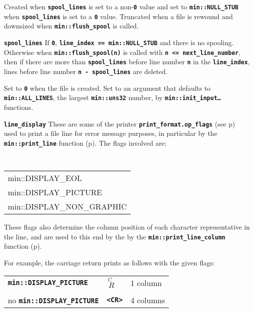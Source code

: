 \documentclass[12pt]{article}
\makeatletter
\newcommand{\TT}[1]{{\tt \bfseries #1}}
\newcommand{\ttmkey}[2]{\TT{#1}\index{#1@{\tt #1}!#2}}
\newcommand{\pagref}[1]{p\pageref{#1}}
\newcommand{\EOL}{\penalty \exhyphenpenalty}
\newenvironment{indpar}[1][0.3in]%
	{\begin{list}{}%
		     {\setlength{\itemsep}{0in}%
		      \setlength{\topsep}{0in}%
		      \setlength{\parsep}{1ex}%
		      \setlength{\labelwidth}{#1}%
		      \setlength{\leftmargin}{#1}%
		      \addtolength{\leftmargin}{\labelsep}}%
	 \item}%
	{\end{list}}
\newenvironment{itemlist}[1][1.2in]%
	{\begin{list}{}{\setlength{\labelwidth}{#1}%
		        \setlength{\leftmargin}{\labelwidth}%
		        \addtolength{\leftmargin}{+0.2in}%
		        \renewcommand{\makelabel}[1]{##1\hfill}}}%
	{\end{list}}
\makeatother
\begin{document}
\begin{itemlist}[1.4in]
Created when \TT{spool\_\EOL lines} is set to a non-\TT{0} value
and set to \TT{min::\EOL NULL\_\EOL STUB}
when \TT{spool\_\EOL lines} is set to a \TT{0} value.
Truncated when a file is rewound and downsized when
\TT{min::\EOL flush\_\EOL spool} is called.

\item[\ttmkey{spool\_\EOL lines}{in {\tt min::file}}]
If \TT{0}, \TT{line\_index~==~min::NULL\_STUB} and there is
no spooling.  Otherwise when \TT{min::flush\_spool(n)} is called
with \TT{n <= next\_\EOL line\_\EOL number}, then
if there are more than \TT{spool\_\EOL lines} before line number
\TT{n} in the \TT{line\_\EOL index}, lines before
line number \TT{n - spool\_lines} are deleted.

Set to \TT{0} when the file is created.  Set to an argument
that defaults to \TT{min::\EOL ALL\_\EOL LINES}, the largest
\TT{min::uns32} number,
by \TT{min::\EOL init\_\EOL input\ldots} functions.

\item[\ttmkey{line\_\EOL display}{in {\tt min::file}}]\label{FILE_LINE_DISPLAY}
These are some of the printer
\TT{print\_\EOL format.op\_flags}
(see \pagref{PRINT_FORMAT_OP_FLAGS}) used to print
a file line for error message purposes,
in particular by the \TT{min::\EOL print\_\EOL line}
function (\pagref{MIN::PRINT_LINE}).
The flags involved are:
\begin{indpar}
\tt
\begin{tabular}{l}
min::DISPLAY\_EOL \\
min::DISPLAY\_PICTURE \\
min::DISPLAY\_NON\_GRAPHIC \\
\end{tabular}
\end{indpar}

These flags also determine the column position of each character representative
in the line, and are used to this end by the
by the \TT{min::\EOL print\_\EOL line\_\EOL column}
function (\pagref{MIN::PRINT_LINE_COLUMN}).

For example, the carriage
return prints as follows with the given flags:
\begin{center}
\begin{tabular}{l@{~~~~}ll}
\TT{min::DISPLAY\_PICTURE}
	& {\tiny $\stackrel{\textstyle C~}{~R}$} & 1 column \\
\\[1ex]
no \TT{min::DISPLAY\_PICTURE} & \TT{<CR>} & 4 columns \\
\end{tabular}
\end{center}


\end{itemlist}
\end{document}
